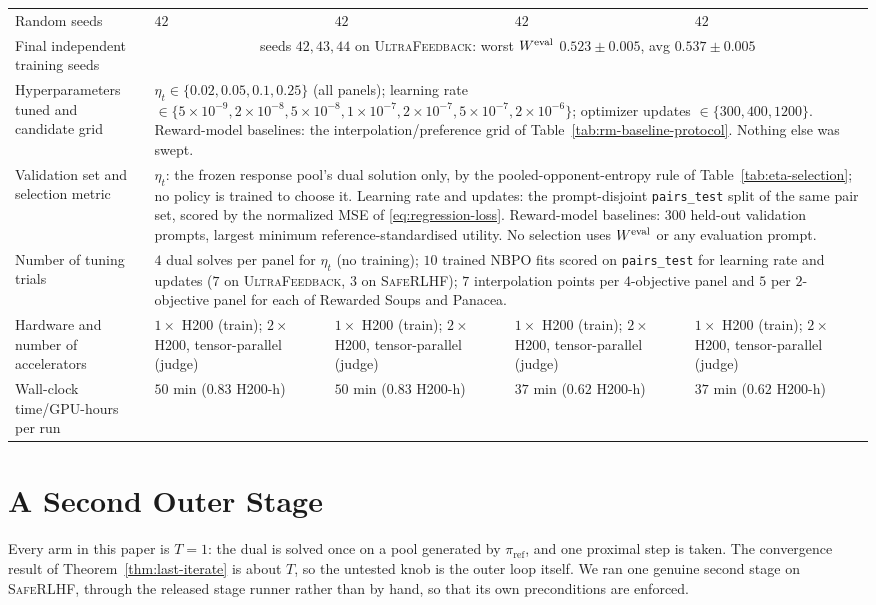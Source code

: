 \documentclass{article}
\theoremstyle{remark}
\theoremstyle{plain}
\newcommand{\piref}{\pi_{\mathrm{ref}}}
\newcommand{\NBPO}{\textsc{NBPO}}
\begin{document}
\begin{table}[t]
\begin{tabular}{@{}p{}p{}p{}p{}p{}@{}}
Random seeds & $42$ & $42$ & $42$ & $42$ \\
Final independent training seeds & \multicolumn{4}{c}{seeds $42,43,44$ on \textsc{UltraFeedback}: worst $W^{\rm eval}$ $0.523\pm0.005$, avg $0.537\pm0.005$} \\
Hyperparameters tuned and candidate grid & \multicolumn{4}{p{0.695\textwidth}}{$\eta_t\in\{0.02,0.05,0.1,0.25\}$ (all panels); learning rate $\in\{5\times10^{-9},2\times10^{-8},5\times10^{-8},1\times10^{-7},2\times10^{-7},5\times10^{-7},2\times10^{-6}\}$; optimizer updates $\in\{300,400,1200\}$. Reward-model baselines: the interpolation/preference grid of Table~\ref{tab:rm-baseline-protocol}. Nothing else was swept.} \\
Validation set and selection metric & \multicolumn{4}{p{0.695\textwidth}}{$\eta_t$: the frozen response pool's dual solution only, by the pooled-opponent-entropy rule of Table~\ref{tab:eta-selection}; no policy is trained to choose it. Learning rate and updates: the prompt-disjoint \texttt{pairs\_test} split of the same pair set, scored by the normalized MSE of \eqref{eq:regression-loss}. Reward-model baselines: $300$ held-out validation prompts, largest minimum reference-standardised utility. No selection uses $W^{\rm eval}$ or any evaluation prompt.} \\
Number of tuning trials & \multicolumn{4}{p{0.695\textwidth}}{$4$ dual solves per panel for $\eta_t$ (no training); $10$ trained \NBPO{} fits scored on \texttt{pairs\_test} for learning rate and updates ($7$ on \textsc{UltraFeedback}, $3$ on \textsc{SafeRLHF}); $7$ interpolation points per $4$-objective panel and $5$ per $2$-objective panel for each of Rewarded Soups and Panacea.} \\
Hardware and number of accelerators & $1\times$ H200 (train); $2\times$ H200, tensor-parallel (judge) & $1\times$ H200 (train); $2\times$ H200, tensor-parallel (judge) & $1\times$ H200 (train); $2\times$ H200, tensor-parallel (judge) & $1\times$ H200 (train); $2\times$ H200, tensor-parallel (judge)\\
Wall-clock time/GPU-hours per run & $50$ min ($0.83$ H200-h) & $50$ min ($0.83$ H200-h) & $37$ min ($0.62$ H200-h) & $37$ min ($0.62$ H200-h)\\
\bottomrule
\end{tabular}
\end{table}

\section{A Second Outer Stage}
\label{app:second-stage}
Every arm in this paper is $T=1$: the dual is solved once on a pool generated by $\piref$, and one
proximal step is taken. The convergence result of Theorem~\ref{thm:last-iterate} is about $T$, so the
untested knob is the outer loop itself. We ran one genuine second stage on \textsc{SafeRLHF}, through
the released stage runner rather than by hand, so that its own preconditions are enforced.
\end{document}
